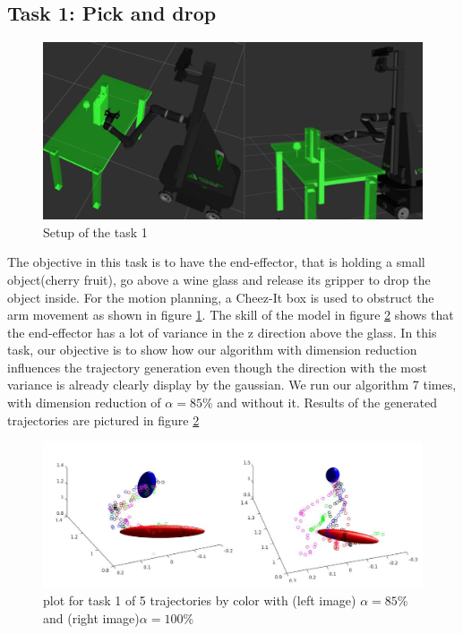 \documentclass[letterpaper, 10 pt, conference]{ieeeconf}  %
\begin{document}
\subsection{Task 1: Pick and drop}
\begin{figure}[h]
	\centering
	\includegraphics[scale=0.22]{figure/task1Scenario.png}
	\caption{Setup of the task 1}
	\label{task1Scenario}
\end{figure}
The objective in this task is to have the end-effector, that is holding a small object(cherry fruit), go above a wine glass and release its gripper to drop the object inside. For the motion planning, a Cheez-It box is used to obstruct the arm movement as shown in figure \ref{task1Scenario}. The skill of the model in figure \ref{trajectoriesTask1} shows that the end-effector has a lot of variance in the z direction above the glass. In this task, our objective is to show how our algorithm with dimension reduction influences the trajectory generation even though the direction with the most variance is already clearly display by the gaussian. We run our algorithm 7 times, with dimension reduction of $\alpha=85 \%$ and without it. Results of the generated trajectories are pictured in figure \ref{trajectoriesTask1} \\
\begin{figure}[h]
	\centering
	\includegraphics[scale=0.24]{figure/plotMixedTask1.png}
	\caption{plot for task 1 of 5 trajectories by color with (left image) $\alpha = 85\%$ and (right image)$\alpha = 100\%$ }
	\label{trajectoriesTask1}
\end{figure}
\end{document}
